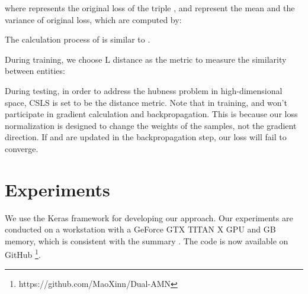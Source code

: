 \documentclass[sigconf]{acmart}
\begin{document}
where  represents the original loss of the triple ,  and  represent the mean and the variance of original loss, which are computed by:


The calculation process of  is similar to .

During training, we choose L distance as the metric to measure the similarity between entities:

During testing, in order to address the hubness problem in high-dimensional space, CSLS \cite{DBLP:conf/iclr/LampleCRDJ18} is set to be the distance metric.
Note that in training,  and  won't participate in gradient calculation and backpropagation.
This is because our loss normalization is designed to change the weights of the samples, not the gradient direction.
If  and  are updated in the backpropagation step, our loss will fail to converge.


\section{Experiments}
We use the Keras framework for developing our approach.
Our experiments are conducted on a workstation with a GeForce GTX TITAN X GPU and GB memory, which is consistent with the summary \cite{9174835}.
The code is now available on GitHub \footnote{https://github.com/MaoXinn/Dual-AMN}.
\end{document}
